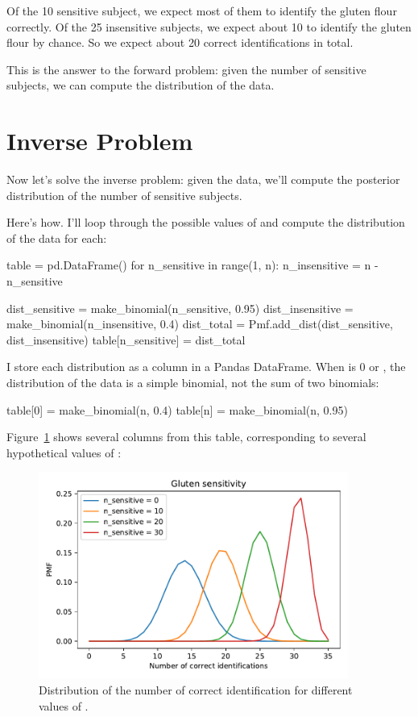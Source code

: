 \documentclass[12pt]{book}
\theoremstyle{exercise}
\begin{document}
Of the 10 sensitive subject, we expect most of them to identify the gluten flour correctly.
Of the 25 insensitive subjects, we expect about 10 to identify the gluten flour by chance.
So we expect about 20 correct identifications in total.

This is the answer to the forward problem: given the number of sensitive subjects, we can compute the distribution of the data.

\section{Inverse Problem}

Now let's solve the inverse problem: given the data, we'll compute the posterior distribution of the number of sensitive subjects.

Here's how.  I'll loop through the possible values of  and compute the distribution of the data for each:

\begin{code}
table = pd.DataFrame()
for n_sensitive in range(1, n):
    n_insensitive = n - n_sensitive

    dist_sensitive = make_binomial(n_sensitive, 0.95)
    dist_insensitive = make_binomial(n_insensitive, 0.4)
    dist_total = Pmf.add_dist(dist_sensitive, dist_insensitive)    
    table[n_sensitive] = dist_total
\end{code}

I store each distribution as a column in a Pandas DataFrame.
When  is 0 or , the distribution of the data is a simple binomial, not the sum of two binomials:

\begin{code}
table[0] = make_binomial(n, 0.4)
table[n] = make_binomial(n, 0.95)
\end{code}

Figure~\ref{fig05-03} shows several columns from this table, corresponding to several hypothetical values of :

\begin{figure}
\centerline{\includegraphics[width=4in]{figs/fig05-03.pdf}}
\caption{Distribution of the number of correct identification for different values of .}
\label{fig05-03}
\end{figure}
\end{document}
